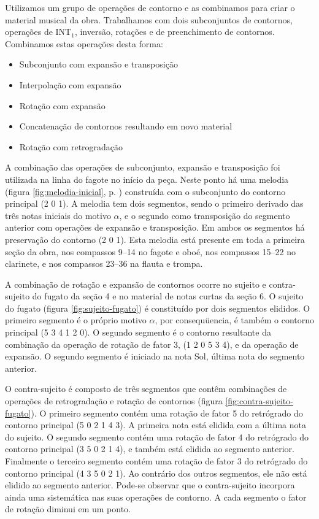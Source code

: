 Utilizamos um grupo de operações de contorno e as combinamos para
criar o material musical da obra. Trabalhamos com dois subconjuntos de
contornos, operações de INT$_1$, inversão, rotações e de preenchimento
de contornos. Combinamos estas operações desta forma:

\begin{itemize}
\item Subconjunto com expansão e transposição
\item Interpolação com expansão
\item Rotação com expansão
\item Concatenação de contornos resultando em novo material
\item Rotação com retrogradação
\end{itemize}

A combinação das operações de subconjunto, expansão e transposição foi
utilizada na linha do fagote no início da peça. Neste ponto há uma
melodia (figura \ref{fig:melodia-inicial},
p. \pageref{fig:melodia-inicial}) construída com o subconjunto do
contorno principal (2 0 1). A melodia tem dois segmentos, sendo o
primeiro derivado das três notas iniciais do motivo $\alpha$, e o
segundo como transposição do segmento anterior com operações de
expansão e transposição. Em ambos os segmentos há preservação do
contorno (2 0 1). Esta melodia está presente em toda a primeira seção
da obra, nos compassos 9--14 no fagote e oboé, nos compassos 15--22 no
clarinete, e nos compassos 23--36 na flauta e trompa.

A combinação de rotação e expansão de contornos ocorre no sujeito e
contra-sujeito do fugato da seção 4 e no material de notas curtas da
seção 6. O sujeito do fugato (figura \ref{fig:sujeito-fugato}) é
constituído por dois segmentos elididos. O primeiro segmento é o
próprio motivo $\alpha$, por consequüencia, é também o contorno
principal (5 3 4 1 2 0). O segundo segmento é o contorno resultante da
combinação da operação de rotação de fator 3, (1 2 0 5 3 4), e da
operação de expansão. O segundo segmento é iniciado na nota Sol,
última nota do segmento anterior.

O contra-sujeito é composto de três segmentos que contêm combinações
de operações de retrogradação e rotação de contornos (figura
\ref{fig:contra-sujeito-fugato}). O primeiro segmento contém uma
rotação de fator 5 do retrógrado do contorno principal (5 0 2 1 4
3). A primeira nota está elidida com a última nota do sujeito. O
segundo segmento contém uma rotação de fator 4 do retrógrado do
contorno principal (3 5 0 2 1 4), e também está elidida ao segmento
anterior. Finalmente o terceiro segmento contém uma rotação de fator 3
do retrógrado do contorno principal (4 3 5 0 2 1). Ao contrário dos
outros segmentos, ele não está elidido ao segmento anterior. Pode-se
observar que o contra-sujeito incorpora ainda uma sistemática nas suas
operações de contorno. A cada segmento o fator de rotação diminui em
um ponto.

